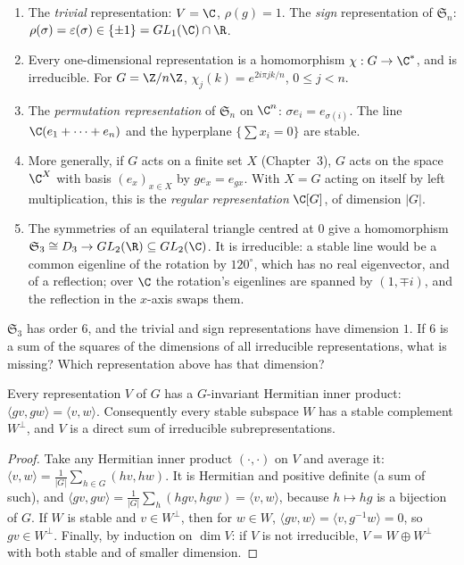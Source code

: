 \begin{example}\label{ex:reps}
\begin{enumerate}[label=(\arabic*)]
\item The \emph{trivial} representation: $V=\C$, $\rho(g)=1$. The \emph{sign} representation of $\mathfrak S_n$: $\rho(\sigma)=\varepsilon(\sigma)\in\{\pm1\}=GL_1(\C)\cap\R$.
\item Every one-dimensional representation is a homomorphism $\chi:G\to\C^*$, and is irreducible. For $G=\Z/n\Z$, $\chi_j(k)=e^{2i\pi jk/n}$, $0\le j<n$.
\item The \emph{permutation representation} of $\mathfrak S_n$ on $\C^n$: $\sigma e_i=e_{\sigma(i)}$. The line $\C(e_1+\dots+e_n)$ and the hyperplane $\{\sum x_i=0\}$ are stable.
\item More generally, if $G$ acts on a finite set $X$ (Chapter~3), $G$ acts on the space $\C^X$ with basis $(e_x)_{x\in X}$ by $ge_x=e_{gx}$. With $X=G$ acting on itself by left multiplication, this is the \emph{regular representation} $\C[G]$, of dimension $|G|$.
\item The symmetries of an equilateral triangle centred at $0$ give a homomorphism $\mathfrak S_3\cong D_3\to GL_2(\R)\subseteq GL_2(\C)$. It is irreducible: a stable line would be a common eigenline of the rotation by $120^\circ$, which has no real eigenvector, and of a reflection; over $\C$ the rotation's eigenlines are spanned by $(1,\mp i)$, and the reflection in the $x$-axis swaps them.
\end{enumerate}
\end{example}

\begin{think}
$\mathfrak S_3$ has order $6$, and the trivial and sign representations have dimension $1$. If $6$ is a sum of the squares of the dimensions of all irreducible representations, what is missing? Which representation above has that dimension?
\end{think}

\begin{theorem}[Maschke]\label{thm:maschke}
Every representation $V$ of $G$ has a $G$-invariant Hermitian inner product: $\langle gv,gw\rangle=\langle v,w\rangle$. Consequently every stable subspace $W$ has a stable complement $W^\perp$, and $V$ is a direct sum of irreducible subrepresentations.
\end{theorem}
\begin{proof}
Take any Hermitian inner product $(\cdot,\cdot)$ on $V$ and average it: $\langle v,w\rangle=\frac1{|G|}\sum_{h\in G}(hv,hw)$. It is Hermitian and positive definite (a sum of such), and $\langle gv,gw\rangle=\frac1{|G|}\sum_h(hgv,hgw)=\langle v,w\rangle$, because $h\mapsto hg$ is a bijection of $G$. If $W$ is stable and $v\in W^\perp$, then for $w\in W$, $\langle gv,w\rangle=\langle v,g^{-1}w\rangle=0$, so $gv\in W^\perp$. Finally, by induction on $\dim V$: if $V$ is not irreducible, $V=W\oplus W^\perp$ with both stable and of smaller dimension.
\end{proof}

